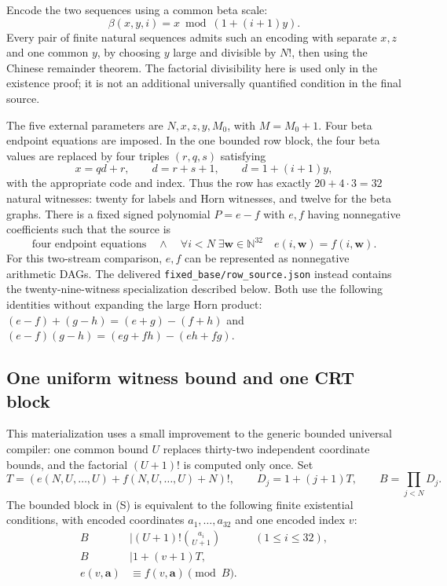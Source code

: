 Encode the two sequences using a common beta scale:
\[
 \beta(x,y,i)=x\bmod(1+(i+1)y).
\]
Every pair of finite natural sequences admits such an encoding with
separate $x,z$ and one common $y$, by choosing $y$ large and divisible by
$N!$, then using the Chinese remainder theorem. The factorial divisibility
here is used only in the existence proof; it is not an additional
universally quantified condition in the final source.

The five external parameters are $N,x,z,y,M_0$, with $M=M_0+1$.
Four beta endpoint equations are imposed. In the one bounded row block,
the four beta values are replaced by four triples $(r,q,s)$ satisfying
\[
 x=qd+r,\qquad d=r+s+1,\qquad d=1+(i+1)y,
\]
with the appropriate code and index. Thus the row has exactly
$20+4\cdot3=32$ natural witnesses: twenty for labels and Horn witnesses,
and twelve for the beta graphs. There is a fixed signed polynomial
$P=e-f$ with $e,f$ having nonnegative coefficients such that the source is
\[
 \text{four endpoint equations}\quad\land\quad
 \forall i<N\;\exists\boldsymbol w\in\mathbb N^{32}\quad
 e(i,\boldsymbol w)=f(i,\boldsymbol w).
 \tag{S}
\]
For this two-stream comparison, $e,f$ can be represented as nonnegative
arithmetic DAGs. The delivered \texttt{fixed\_base/row\_source.json} instead
contains the twenty-nine-witness specialization described below. Both use
the following identities without expanding the large Horn product:
$(e-f)+(g-h)=(e+g)-(f+h)$ and
$(e-f)(g-h)=(eg+fh)-(eh+fg)$.

\subsection{One uniform witness bound and one CRT block}

This materialization uses a small improvement to the generic bounded
universal compiler: one common bound $U$ replaces thirty-two independent
coordinate bounds, and the factorial $(U+1)!$ is computed only once.
Set
\[
 T=(e(N,U,\ldots,U)+f(N,U,\ldots,U)+N)!,\qquad
 D_j=1+(j+1)T,\qquad B=\prod_{j<N}D_j.
\]
The bounded block in (S) is equivalent to the following finite
existential conditions, with encoded coordinates $a_1,\ldots,a_{32}$
and one encoded index $v$:
\begin{align*}
 B&\mid (U+1)!\binom{a_i}{U+1} &&(1\leq i\leq32),\\
 B&\mid 1+(v+1)T,\\
 e(v,\boldsymbol a)&\equiv f(v,\boldsymbol a)\pmod B.
\end{align*}

